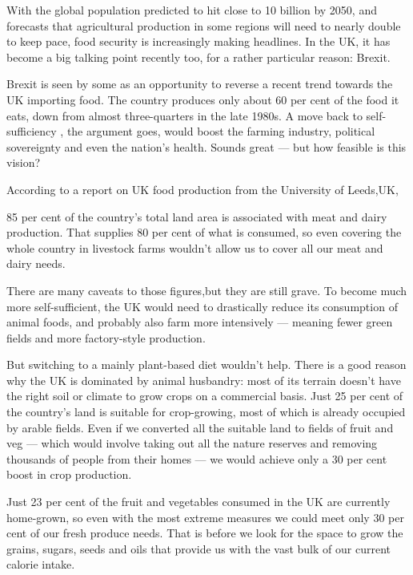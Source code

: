 With the global population predicted to hit close to 10 billion by 2050, and forecasts that agricultural production in some regions will need to nearly double to keep pace, food security is increasingly making headlines. In the UK, it has become a big talking point recently too, for a rather particular reason: Brexit.


Brexit is seen by some as an opportunity to reverse a recent trend towards the UK importing food. The country produces only about 60 per cent of the food it eats, down from almost three-quarters in the late 1980s. A move back to self-sufficiency , the argument goes, would boost the farming industry, political sovereignty and even the nation's health. Sounds great — but how feasible is this vision?


According to a report on UK food production from the University of Leeds,UK,


85 per cent of the country's total land area is associated with meat and dairy production. That supplies 80 per cent of what is consumed, so even covering the whole country in livestock farms wouldn't allow us to cover all our meat and dairy needs.


There are many caveats to those figures,but they are still grave. To become much more self-sufficient, the UK would need to drastically reduce its consumption of animal foods, and probably also farm more intensively — meaning fewer green fields and more factory-style production.


But switching to a mainly plant-based diet wouldn't help. There is a good reason why the UK is dominated by animal husbandry: most of its terrain doesn't have the right soil or climate to grow crops on a commercial basis. Just 25 per cent of the country's land is suitable for crop-growing, most of which is already occupied by arable fields. Even if we converted all the suitable land to fields of fruit and veg — which would involve taking out all the nature reserves and removing thousands of people from their homes — we would achieve only a 30 per cent boost in crop production.


Just 23 per cent of the fruit and vegetables consumed in the UK are currently home-grown, so even with the most extreme measures we could meet only 30 per cent of our fresh produce needs. That is before we look for the space to grow the grains, sugars, seeds and oils that provide us with the vast bulk of our current calorie intake.


